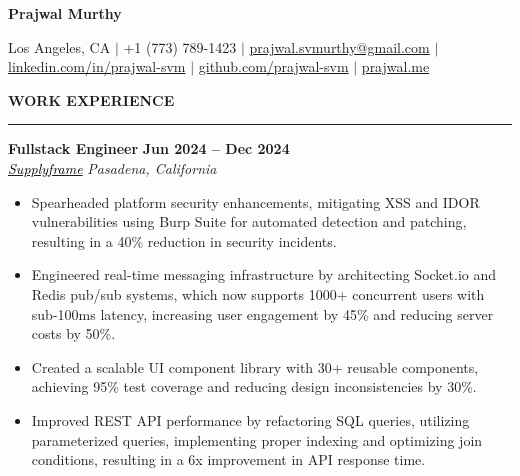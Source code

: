 \documentclass[10pt,letterpaper]{article}
\begin{document}
{\centering\huge\textbf{Prajwal Murthy}\par}
\vspace{2mm}
{\centering\small{Los Angeles, CA $|$ +1 (773) 789-1423 $|$  \href{mailto:prajwal.svmurthy@gmail.com}{prajwal.svmurthy@gmail.com} $|$ \href{https://linkedin.com/in/prajwal-svm}{linkedin.com/in/prajwal-svm} $|$  \href{https://github.com/prajwal-svm}{github.com/prajwal-svm}  $|$   \href{https://prajwal.me}{prajwal.me}}\par}
\vspace{1mm}

{\hspace{0in}\small\textbf{WORK EXPERIENCE}}\par
\vspace{-2mm}
\noindent\rule{\textwidth}{0.1pt}
\vspace{-4mm}

\hspace{0in}\textbf{Fullstack Engineer} \hfill \textbf{Jun 2024 -- Dec 2024}\\
\hspace{0in}\textit{\href{https://supplyframe.com}{\textcolor{black}{Supplyframe}}} \hfill \textit{Pasadena, California} %
\begin{itemize}[leftmargin=0.15in,nosep,topsep=3pt,itemsep=1mm]
   \item Spearheaded platform security enhancements, mitigating XSS and IDOR vulnerabilities using Burp Suite for automated detection and patching, resulting in a 40\% reduction in security incidents.
   \item Engineered real-time messaging infrastructure by architecting Socket.io and Redis pub/sub systems, which now supports 1000+ concurrent users with sub-100ms latency, increasing user engagement by 45\% and reducing server costs by 50\%.
   \item Created a scalable UI component library with 30+ reusable components, achieving 95\% test coverage and reducing design inconsistencies by 30\%.
   \item Improved REST API performance by refactoring SQL queries, utilizing parameterized queries, implementing proper indexing and optimizing join conditions, resulting in a 6x improvement in API response time.
\end{itemize}
\end{document}
